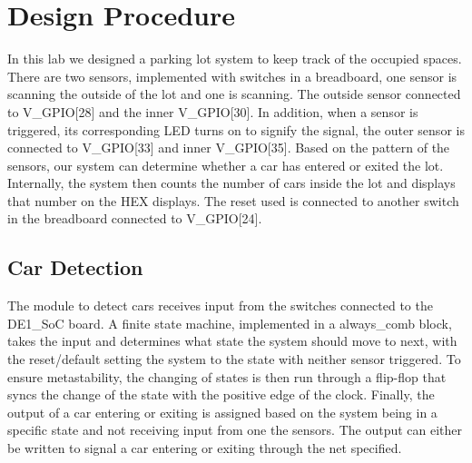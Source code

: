 \documentclass[11pt, titlepage]{article}
\author{Cameron Jennings (ID: 2029631), Donovan Clay (ID: 2276005)}
\title{\assignmentname}
\date{\parbox{\linewidth}{\centering
\experimentDate
  \endgraf\bigskip
  \className\
}}
\begin{document}
	\maketitle
 
    \setcounter{tocdepth}{2}
    \begin{center}
        \tableofcontents\label{beginning}
    \end{center}
    \newpage
    
    \section{Design Procedure}
        In this lab we designed a parking lot system to keep track of the occupied spaces. There are two sensors, implemented with switches in a breadboard, one sensor is scanning the outside of the lot and one is scanning. The outside sensor connected to V\_GPIO[28] and the inner V\_GPIO[30]. In addition, when a sensor is triggered, its corresponding LED turns on to signify the signal, the outer sensor is connected to V\_GPIO[33] and inner V\_GPIO[35]. Based on the pattern of the sensors, our system can determine whether a car has entered or exited the lot. Internally, the system then counts the number of cars inside the lot and displays that number on the HEX displays. The reset used is connected to another switch in the breadboard connected to V\_GPIO[24].

        \subsection{Car Detection}
            The module to detect cars receives input from the switches connected to the DE1\_SoC board. A finite state machine, implemented in a always\_comb block, takes the input and determines what state the system should move to next, with the reset/default setting the system to the state with neither sensor triggered. To ensure metastability, the changing of states is then run through a flip-flop that syncs the change of the state with the positive edge of the clock. Finally, the output of a car entering or exiting is assigned based on the system being in a specific state and not receiving input from one the sensors. The output can either be written to signal a car entering or exiting through the net specified.
\end{document}
